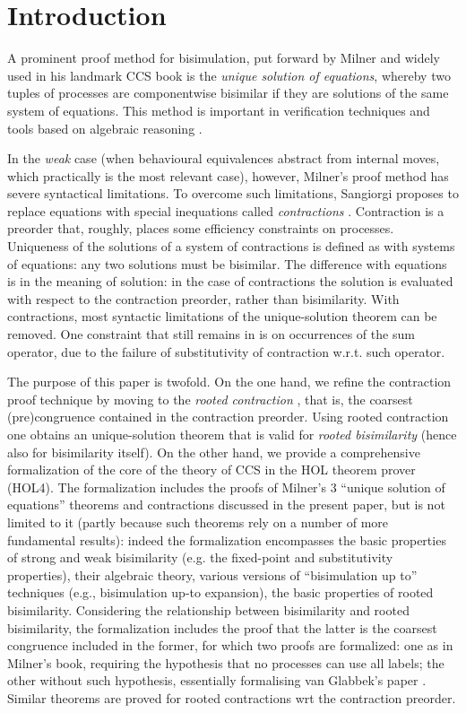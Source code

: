\section{Introduction}

A prominent proof method for bisimulation, put forward by Milner and widely used in his
landmark CCS book \cite{Mil89} is the
\emph{unique solution of equations}, whereby two tuples of processes are
componentwise bisimilar if they are solutions 
of the same system of equations.
This method  is important in verification techniques and tools
based on algebraic reasoning \cite{theoryAndPractice,RosUnder10,BaeBOOK}. 

In the   \emph{weak} case (when  behavioural equivalences abstract from internal moves,
which practically is the most relevant case), however, 
Milner's proof method has severe syntactical limitations. 
To overcome such limitations, Sangiorgi proposes to replace
equations with  special inequations called
\emph{contractions} \cite{sangiorgi2015equations}. Contraction is a
preorder that, roughly, places some efficiency
constraints on processes.  Uniqueness of the solutions of a system of contractions
 is defined as with systems of equations:  
any two solutions must be bisimilar.
The difference with equations is in the meaning of solution:
in the case of contractions
the solution is evaluated with respect to
the contraction preorder, rather than bisimilarity. 
With contractions, most syntactic limitations of the unique-solution theorem can be
removed.  One constraint that still remains in
\cite{sangiorgi2015equations} is on occurrences of the sum operator,
due to the failure of substitutivity of contraction w.r.t. such operator.

The purpose of this paper is twofold. 
On the one hand, we refine the contraction proof technique by moving to the 
\emph{rooted contraction} \cite{Tian:2017wrba}, that is, the coarsest (pre)congruence contained in the contraction
preorder.  Using rooted contraction one obtains an unique-solution theorem that is valid for
\emph{rooted bisimilarity} (hence also for bisimilarity itself).  
On the other hand, we provide a  
 comprehensive formalization  of the core of the theory of CCS 
 in the HOL
theorem prover (HOL4). The formalization  includes the proofs of
Milner's 3 ``unique solution of equations'' theorems and
contractions discussed in the present paper, but is not limited to it (partly because such
theorems rely on a number of more fundamental results):
indeed the formalization encompasses the basic properties of strong and weak
bisimilarity (e.g. the fixed-point and substitutivity properties), 
their algebraic theory, various versions of ``bisimulation up to''
techniques (e.g., bisimulation up-to expansion),
the basic properties  of rooted bisimilarity. Considering the relationship between bisimilarity and rooted
bisimilarity, the formalization includes the proof that the latter is the coarsest
congruence included in the former, for which two proofs are formalized: one as in Milner's
book,  requiring the hypothesis that  no processes can use all labels; the other without
such hypothesis, essentially formalising van Glabbek's paper \cite{vanGlabbeek:2005ur}.
Similar theorems are proved for rooted contractions wrt the contraction preorder. 

